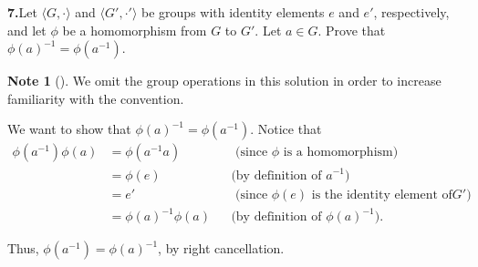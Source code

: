 \documentclass[10pt,]{book}
\theoremstyle{plain}
\theoremstyle{definition}
\theoremstyle{definition}
\newtheorem{note}[theorem]{Note}
\theoremstyle{definition}
\theoremstyle{definition}
\numberwithin{equation}{section}
\newcommand{\amp}{&}
\begin{document}
\par\smallskip
\noindent\textbf{7.}\quad{}Let \(\langle G,\cdot\rangle\) and \(\langle G',\cdot'\rangle\) be groups with identity elements \(e\) and \(e'\), respectively, and let \(\phi\) be a homomorphism from \(G\) to \(G'\). Let \(a\in G\). Prove that \(\phi(a)^{-1}=\phi(a^{-1})\).%
\par\smallskip
\begin{note}[]\label{note-8}
We omit the group operations in this solution in order to increase familiarity with the convention.%
\end{note}
We want to show that \(\phi(a)^{-1}=\phi(a^{-1})\). Notice that%
\begin{align*}
\phi(a^{-1})\phi(a)\amp =\phi(a^{-1}a)\amp \amp \text{ (since \(\phi\) is a homomorphism) }\\
\amp =\phi(e)\amp \amp \text{(by definition of \(a^{-1}\))}\\
\amp =e'\amp \amp  \text{ (since \(\phi(e)\) is the identity element of
\(G'\)) }\\
\amp =\phi(a)^{-1}\phi(a)\amp \amp \text{(by definition of \(\phi(a)^{-1}\))} .
\end{align*}
%
\par
Thus, \(\phi(a^{-1})=\phi(a)^{-1}\), by right cancellation.%
\par\smallskip
\end{document}

